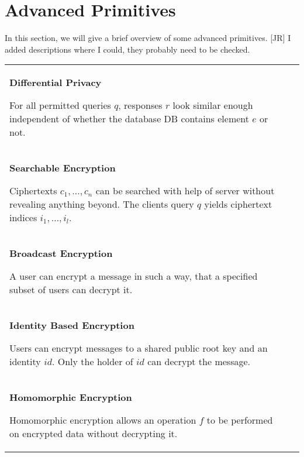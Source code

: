 \section{Advanced Primitives}

In this section, we will give a brief overview of some advanced primitives.
\alert{[JR] I added descriptions where I could, they probably need to be checked.}

\begin{longtable}{p{.4\linewidth}p{.6\linewidth}}
\textbf{Differential Privacy}\par
For all permitted queries $q$, responses $r$ look similar enough independent of whether the database $\mathrm{DB}$ contains element $e$ or not.
&
\begin{minipage}[t][][c]{\linewidth}
    \centering
    
\end{minipage}\\

\textbf{Searchable Encryption}\par
Ciphertexts $c_1,\dots,c_n$ can be searched with help of server without revealing anything beyond.
The clients query $q$ yields ciphertext indices $i_1, \dots, i_l$.
&
\begin{minipage}[t][][c]{\linewidth}
    \centering
    
\end{minipage}\\

\textbf{Broadcast Encryption}\par
A user can encrypt a message in such a way, that a specified subset of users can decrypt it.
&
\begin{minipage}[t][][c]{\linewidth}
    \centering
    
\end{minipage}\\

\textbf{Identity Based Encryption}\par
Users can encrypt messages to a shared public root key and an identity $\mathit{id}$.
Only the holder of $\mathit{id}$ can decrypt the message.
&
\begin{minipage}[t][][c]{\linewidth}
    \centering
    
\end{minipage}\\

\textbf{Homomorphic Encryption}\par
Homomorphic encryption allows an operation $f$ to be performed on encrypted data without decrypting it.
&
\begin{minipage}[t][][c]{\linewidth}
    \centering
    
\end{minipage}\\


\end{longtable}
